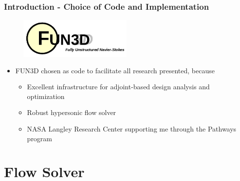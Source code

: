 \documentclass{beamer}
\begin{document}
\begin{frame}
  \vspace{-0.2cm}
  \frametitle{Introduction - Choice of Code and Implementation}
  \begin{figure}[ht]
    \centering
    \includegraphics[width=0.5\textwidth]{figures/fun3d_logo.png}
    \label{fig:fun3d}
  \end{figure}
  \begin{itemize}
    \item FUN3D chosen as code to facilitate all research presented, because
      \begin{itemize}
        \item Excellent infrastructure for adjoint-based design analysis and optimization
        \item Robust hypersonic flow solver
        \item NASA Langley Research Center supporting me through the Pathways
          program
      \end{itemize}
  \end{itemize}
\end{frame}

\section{Flow Solver}
\end{document}
